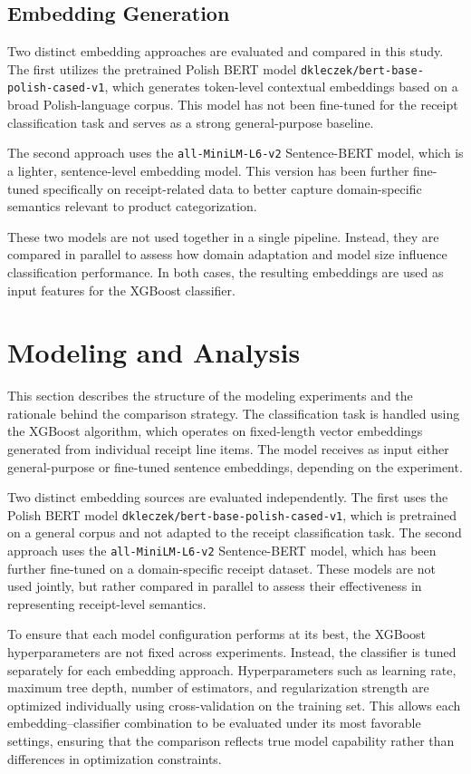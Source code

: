 \documentclass{SGGW-thesis-EN}
\begin{document}
\newpage
\subsection{Embedding Generation}
Two distinct embedding approaches are evaluated and compared in this study. The first utilizes the pretrained Polish BERT model 
\texttt{dkleczek/bert-base-polish-cased-v1}, which generates token-level contextual embeddings based on a broad Polish-language corpus.  
This model has not been fine-tuned for the receipt classification task and serves as a strong general-purpose baseline.

The second approach uses the \texttt{all-MiniLM-L6-v2} Sentence-BERT model, which is a lighter, sentence-level embedding model. This version has  
been further fine-tuned specifically on receipt-related data to better capture domain-specific semantics relevant to product categorization.

These two models are not used together in a single pipeline. Instead, they are compared in parallel to assess how domain adaptation and model  
size influence classification performance. In both cases, the resulting embeddings are used as input features for the XGBoost classifier.



\section{Modeling and Analysis}
This section describes the structure of the modeling experiments and the rationale behind the comparison strategy. The classification task is  
handled using the XGBoost algorithm, which operates on fixed-length vector embeddings generated from individual receipt line items. The model  
receives as input either general-purpose or fine-tuned sentence embeddings, depending on the experiment.

Two distinct embedding sources are evaluated independently. The first uses the Polish BERT model \texttt{dkleczek/bert-base-polish-cased-v1},  
which is pretrained on a general corpus and not adapted to the receipt classification task. The second approach uses the  
\texttt{all-MiniLM-L6-v2} Sentence-BERT model, which has been further fine-tuned on a domain-specific receipt dataset. These models are not  
used jointly, but rather compared in parallel to assess their effectiveness in representing receipt-level semantics.

To ensure that each model configuration performs at its best, the XGBoost hyperparameters are not fixed across experiments. Instead, the  
classifier is tuned separately for each embedding approach. Hyperparameters such as learning rate, maximum tree depth, number of estimators,  
and regularization strength are optimized individually using cross-validation on the training set. This allows each embedding–classifier  
combination to be evaluated under its most favorable settings, ensuring that the comparison reflects true model capability rather than  
differences in optimization constraints.
\end{document}

